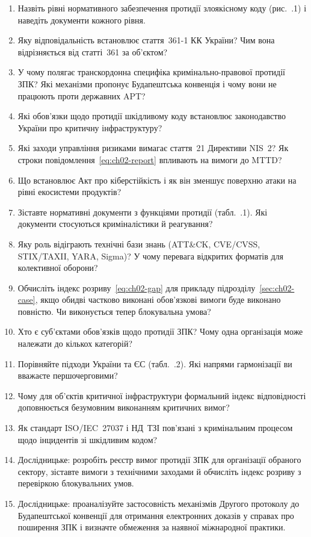 \selfcheck
\begin{enumerate}
\item Назвіть рівні нормативного забезпечення протидії злоякісному коду (рис.~\thechapter.1) і наведіть документи кожного рівня.
\item Яку відповідальність встановлює стаття~361-1 КК України? Чим вона відрізняється від статті~361 за об'єктом?
\item У чому полягає транскордонна специфіка кримінально-правової протидії ЗПК? Які механізми пропонує Будапештська конвенція і чому вони не працюють проти державних APT?
\item Які обов'язки щодо протидії шкідливому коду встановлює законодавство України про критичну інфраструктуру?
\item Які заходи управління ризиками вимагає стаття~21 Директиви NIS~2? Як строки повідомлення~\eqref{eq:ch02-report} впливають на вимоги до MTTD?
\item Що встановлює Акт про кіберстійкість і як він зменшує поверхню атаки на рівні екосистеми продуктів?
\item Зіставте нормативні документи з функціями протидії (табл.~\thechapter.1). Які документи стосуються криміналістики й реагування?
\item Яку роль відіграють технічні бази знань (ATT\&CK, CVE/CVSS, STIX/TAXII, YARA, Sigma)? У чому перевага відкритих форматів для колективної оборони?
\item Обчисліть індекс розриву~\eqref{eq:ch02-gap} для прикладу підрозділу~\ref{sec:ch02-case}, якщо обидві частково виконані обов'язкові вимоги буде виконано повністю. Чи виконується тепер блокувальна умова?
\item Хто є суб'єктами обов'язків щодо протидії ЗПК? Чому одна організація може належати до кількох категорій?
\item Порівняйте підходи України та ЄС (табл.~\thechapter.2). Які напрями гармонізації ви вважаєте першочерговими?
\item Чому для об'єктів критичної інфраструктури формальний індекс відповідності доповнюється безумовним виконанням критичних вимог?
\item Як стандарт ISO/IEC~27037 і НД~ТЗІ пов'язані з кримінальним процесом щодо інцидентів зі шкідливим кодом?
\item Дослідницьке: розробіть реєстр вимог протидії ЗПК для організації обраного сектору, зіставте вимоги з технічними заходами й обчисліть індекс розриву з перевіркою блокувальних умов.
\item Дослідницьке: проаналізуйте застосовність механізмів Другого протоколу до Будапештської конвенції для отримання електронних доказів у справах про поширення ЗПК і визначте обмеження за наявної міжнародної практики.
\end{enumerate}
